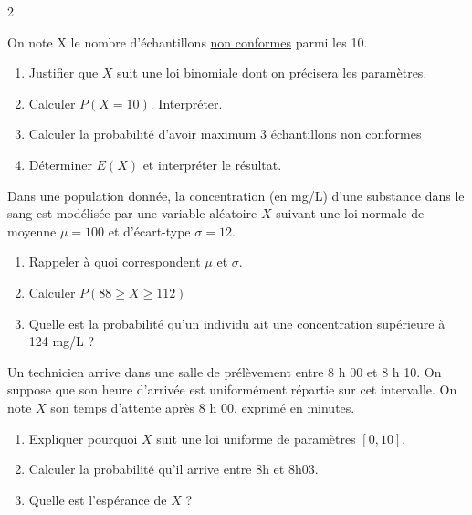\documentclass[10pt,a4paper]{article}
\begin{document}
\begin{multicols}{2}
\begin{exo}
On note X le nombre d'échantillons \underline{non conformes} parmi les 10.

\begin{enumerate}
    \item Justifier que \(X\) suit une loi binomiale dont on précisera les paramètres.
    \item Calculer \(P(X=10)\). Interpréter.
    \item Calculer la probabilité d'avoir maximum 3 échantillons non conformes
    \item Déterminer \(E(X)\) et interpréter le résultat.
\end{enumerate}
\end{exo}

\begin{exo}[][]
    Dans une population donnée, la concentration (en mg/L) d'une substance dans le sang est modélisée par une variable aléatoire \(X\) suivant une loi normale de moyenne \(\mu = 100\) et d'écart-type \(\sigma = 12\).
    \begin{enumerate}
        \item Rappeler à quoi correspondent \(\mu\) et \(\sigma\).
        \item Calculer \(P(88\geq X\geq 112)\)
        \item Quelle est la probabilité qu'un individu ait une concentration supérieure à 124 mg/L ?
    \end{enumerate}
\end{exo}

\begin{exo}[][]
    Un technicien arrive dans une salle de prélèvement entre 8 h 00 et 8 h 10. On suppose que son heure d'arrivée est uniformément répartie sur cet intervalle.
    \medskip
    On note \(X\) son temps d'attente après 8 h 00, exprimé en minutes.
    \begin{enumerate}
        \item Expliquer pourquoi \(X\) suit une loi uniforme de paramètres \([0,10]\).
        \item Calculer la probabilité qu'il arrive entre 8h et 8h03.
        \item Quelle est l'espérance de \(X\) ? 
    \end{enumerate}
\end{exo}


\end{multicols}
\end{document}
